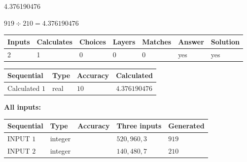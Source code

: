 \documentclass{ctexart}
\begin{document}
 

4.376190476
 
 
\noindent{}
 
 

 
 
 
\noindent{}
 
 

$ %
919 \div  %
210=   %
4.376190476$
 
 
\noindent{}
 
 

 
   
   
   
   
\noindent\begin{tabular}{|l|l|l|l|l|l|l|}
 \hline
Inputs & Calculates & Choices & Layers & Matches & Answer & Solution \\ \hline
 2  & 
 1  & 
 0
  & 
 0  & 
 0  & 
  yes & 
  yes 
  \\ \hline
 \end{tabular}
   
   
   
   
\noindent{}
   
   
  
  
\noindent\begin{tabular}{|l|l|l|l|}
\hline
 Sequential & Type & Accuracy & Calculated \\ 
\hline
 
 
  Calculated $  1 $ & real & $  10  $ & 
 $ 4.376190476 $ 
 \\  \hline  
 \end{tabular}
   
   
   
   
\noindent\vspace{0.1in}\hspace{-0.08in} {\textbf{\Large{All inputs: }}}
   
   
  
  
\noindent\begin{tabular}{|l|l|l|l|l|}
\hline
 Sequential & Type & Accuracy & Three inputs & Generated \\ 
\hline
 
 
  INPUT $  1 $ & integer &  & $
 520
 , 
 960
 , 
 3
 $ & $ 919 $ 
 \\  \hline  
 
 
  INPUT $  2 $ & integer &  & $
 140
 , 
 480
 , 
 7
 $ & $ 210 $ 
 \\  \hline  
 \end{tabular}
   
\end{document}
